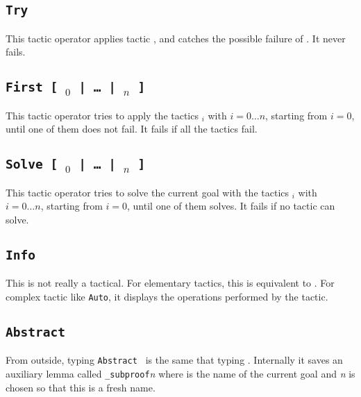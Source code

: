 \subsection{\tt Try {\tac}}
This tactic operator applies tactic \tac, and catches the possible
failure of \tac. It never fails.

\subsection{\tt First [ \tac$_0$ | \dots\ | \tac$_n$ ]}

This tactic operator tries to apply the tactics \tac$_i$ with $i=0\ldots{}n$,
starting from $i=0$, until one of them does not fail. It fails if all the
tactics fail.

\begin{ErrMsgs}
\item {}
\end{ErrMsgs}

\subsection{\tt Solve [ \tac$_0$ | \dots\ | \tac$_n$ ]}

This tactic operator tries to solve the current goal with the tactics \tac$_i$
with $i=0\ldots{}n$, starting from $i=0$, until one of them solves. It fails if
no tactic can solve.

\begin{ErrMsgs}
\item {}
\end{ErrMsgs}

\subsection{\tt Info {\tac}}
This is not really a tactical. For elementary tactics, this is
equivalent to \tac. For complex tactic like \texttt{Auto}, it displays
the operations performed by the tactic.

\subsection{\tt Abstract {\tac}}
From outside, typing \texttt{Abstract \tac} is the same that
typing \tac. Internally it saves an auxiliary lemma called 
{\ident}\texttt{\_subproof}\textit{n} where {\ident} is the name of the
current goal and \textit{n} is chosen so that this is a fresh name.

